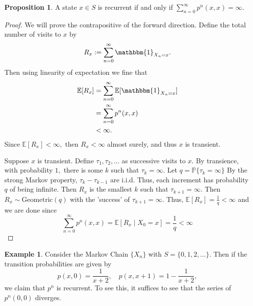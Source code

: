 \documentclass[10pt, oneside]{article}
\newcommand{\bbP}{\mathbb{P}}
\newcommand{\bbE}{\mathbb{E}}
\theoremstyle{definition}
\newtheorem{exmp}{Example}[section]
\newtheorem{prop}{Proposition}
\begin{document}
\begin{prop}
    A state $x\in S$ is recurrent if and only if $\displaystyle\sum_{n=0}^\infty p^n(x,x)  = \infty.$
\end{prop}
\begin{proof}
We will prove the contrapositive of the forward direction.
    Define the total number of visits to $x$ by 
    \[R_x := \sum_{n=0}^\infty \mathbbm{1}_{X_n = x}.\] Then using linearity of expectation we fine that 
    \begin{align*}
        \bbE[R_x] &= \sum_{n=0}^\infty \bbE[\mathbbm{1}_{X_n = x}]\\
        &= \sum_{n=0}^\infty p^n(x,x)\\
        &< \infty.
    \end{align*}
   Since $\bbE[R_x] < \infty,$ then $R_x < \infty$ almost surely, and thus $x$ is transient.  

   Suppose $x$ is transient. Define $\tau_1, \tau_2, \dots$ as successive visits to $x.$ By transience, with probability $1,$ there is some $k$ such that $\tau_k = \infty.$ Let $q = \bbP\{\tau_k = \infty\}$ By the strong Markov property, $\tau_{k} - \tau_{k-1}$ are i.i.d. Thus, each increment has probability $q$ of being infinite. Then $R_x$ is the smallest $k$ such that $\tau_{k+1} = \infty.$ Then $R_x \sim \text{Geometric}(q)$ with the 'success' of $\tau_{k+1} = \infty.$ Thus, $\bbE[R_x] = \frac{1}{q}< \infty$ and we are done since 
   \[\sum_{n=0}^\infty p^n(x,x) = \bbE[R_x \mid X_0 = x] = \frac{1}{q} < \infty\]
\end{proof}
\begin{exmp}
    Consider the Markov Chain $\{X_n\}$ with $S = \{0,1,2,\dots\}.$ Then if the transition probabilities are given by 
    \[p(x,0) = \frac{1}{x + 2}, \quad p(x,x + 1) = 1 - \frac{1}{x + 2},\] we claim that $p^n$ is recurrent. To see this, it suffices to see that the series of $p^n(0,0)$ diverges. 
\end{exmp}


\newpage
\end{document}
